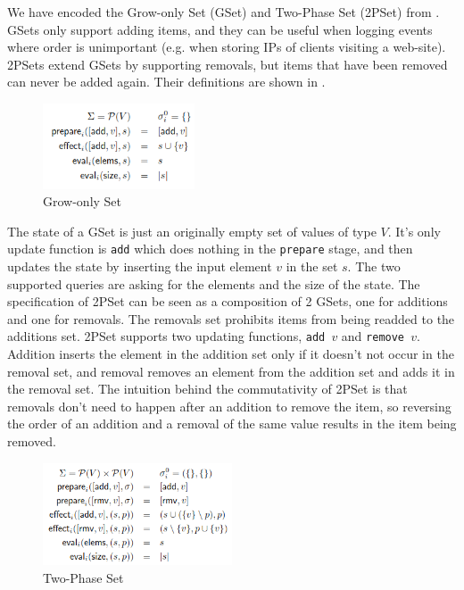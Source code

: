 \documentclass{article}
\begin{document}
We have encoded the Grow-only Set (GSet) and Two-Phase Set (2PSet)
from \cite{baquero2017pure}. GSets only support adding items, and they
can be useful when logging events where order is unimportant
(e.g. when storing IPs of clients visiting a web-site). 2PSets extend
GSets by supporting removals, but items that have been removed can
never be added again. Their definitions are shown in
.

\begin{figure}[h]
    \centering
    \includegraphics[width=0.4\textwidth]{grow-only-set-definition}
    \caption{Grow-only Set}
    \label{fig:gset-def}
\end{figure}

The state of a GSet is just an originally empty set of values of type
$V$. It's only update function is \texttt{add} which does nothing in
the \texttt{prepare} stage, and then updates the state by inserting
the input element $v$ in the set $s$. The two supported queries are
asking for the elements and the size of the state. The specification
of 2PSet can be seen as a composition of 2 GSets, one for additions
and one for removals. The removals set prohibits items from being
readded to the additions set. 2PSet supports two updating functions,
\texttt{add $v$} and \texttt{remove $v$}. Addition inserts the element
in the addition set only if it doesn't not occur in the removal set,
and removal removes an element from the addition set and adds it in
the removal set. The intuition behind the commutativity of 2PSet is
that removals don't need to happen after an addition to remove the
item, so reversing the order of an addition and a removal of the same
value results in the item being removed.


\begin{figure}[h]
    \centering
    \includegraphics[width=0.5\textwidth]{2pset-definition}
    \caption{Two-Phase Set}
    \label{fig:2pset-def}
\end{figure}
\end{document}
